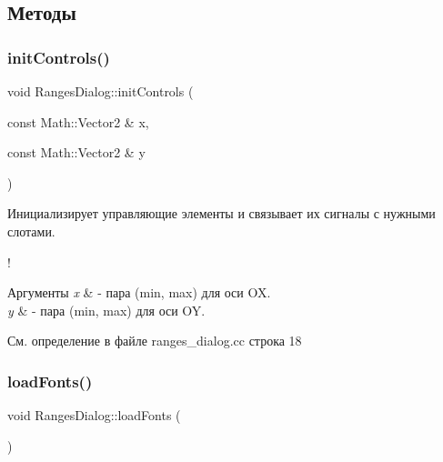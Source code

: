 \subsection{Методы}
\hypertarget{class_ranges_dialog_aa05dcc5245ec5014e71866acdfc81de1}{}\label{class_ranges_dialog_aa05dcc5245ec5014e71866acdfc81de1} 
\subsubsection{\texorpdfstring{init\+Controls()}{initControls()}}
{\footnotesize\ttfamily void Ranges\+Dialog\+::init\+Controls (\begin{DoxyParamCaption}\item[{const Math\+::\+Vector2 \&}]{x,  }\item[{const Math\+::\+Vector2 \&}]{y }\end{DoxyParamCaption})\hspace{0.3cm}{\ttfamily [private]}}



Инициализирует управляющие элементы и связывает их сигналы с нужными слотами. 

! 
\begin{DoxyParams}{Аргументы}
{\em x} & -\/ пара (min, max) для оси OX. \\
\hline
{\em y} & -\/ пара (min, max) для оси OY. \\
\hline
\end{DoxyParams}


См. определение в файле ranges\+\_\+dialog.\+cc строка 18

\hypertarget{class_ranges_dialog_ad57f53fe1a4c87c825f02154b539c10c}{}\label{class_ranges_dialog_ad57f53fe1a4c87c825f02154b539c10c} 
\subsubsection{\texorpdfstring{load\+Fonts()}{loadFonts()}}
{\footnotesize\ttfamily void Ranges\+Dialog\+::load\+Fonts (\begin{DoxyParamCaption}{ }\end{DoxyParamCaption})\hspace{0.3cm}{\ttfamily [private]}}



